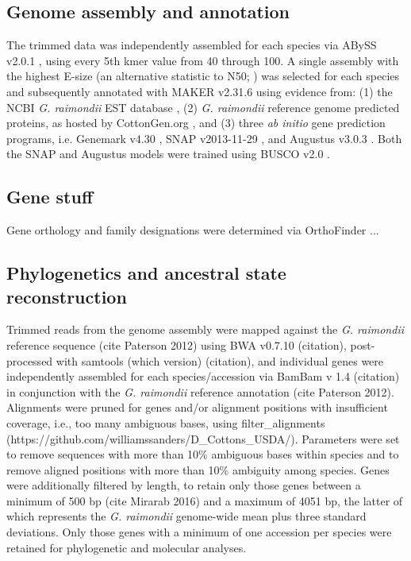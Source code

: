 \documentclass{bmcart}
\newcommand{\note}[2][]{\added[id=#1,remark={#2}]{}}
\begin{document}
\subsection*{Genome assembly and annotation}
The trimmed data was independently assembled for each species via ABySS v2.0.1 \note[Corrinne]{citation}, using every 5th kmer value from 40 through 100. A single assembly with the highest E-size  (an alternative statistic to N50; \note[Corrinne]{citation Salzberg 2011}) was selected for each species and subsequently annotated with MAKER v2.31.6 \note[Corrinne]{citation} using evidence from: (1) the NCBI \textit{G. raimondii} EST database \note[Corrinne]{citation}, (2) \textit{G. raimondii} reference genome predicted proteins, as hosted by CottonGen.org \note[Corrinne]{citation}, and (3) three \textit{ab initio} gene prediction programs, i.e. Genemark v4.30 \note[Corrinne]{citation}, SNAP v2013-11-29 \note[Corrinne]{citation}, and Augustus v3.0.3 \note[Corrinne]{citation}. Both the SNAP and Augustus models were trained using BUSCO v2.0 \note[Corrinne]{citation}.    

\subsection*{Gene stuff}
Gene orthology and family designations were determined via OrthoFinder \note[Corrinne]{citation}...

\subsection*{Phylogenetics and ancestral state reconstruction}
Trimmed reads from the genome assembly were mapped against the \textit{G. raimondii} reference sequence (cite Paterson 2012) using BWA v0.7.10 (citation), post-processed with samtools (which version) (citation), and individual genes were independently assembled for each species/accession via BamBam v 1.4  (citation) in conjunction with the \textit{G. raimondii} reference annotation (cite Paterson 2012).  Alignments were pruned for genes and/or alignment positions with insufficient coverage, i.e., too many ambiguous bases, using filter_alignments (https://github.com/williamssanders/D_Cottons_USDA/). Parameters were set  to remove sequences with more than 10\% ambiguous bases within species and to remove aligned positions with more than 10\% ambiguity among species. Genes were additionally filtered by length, to retain only those genes between a minimum of 500 bp (cite Mirarab 2016) and a maximum of 4051 bp, the latter of which represents the \textit{G. raimondii} genome-wide mean plus three standard deviations. Only those genes with a minimum of one accession per species were retained for phylogenetic and molecular analyses. 
\end{document}

